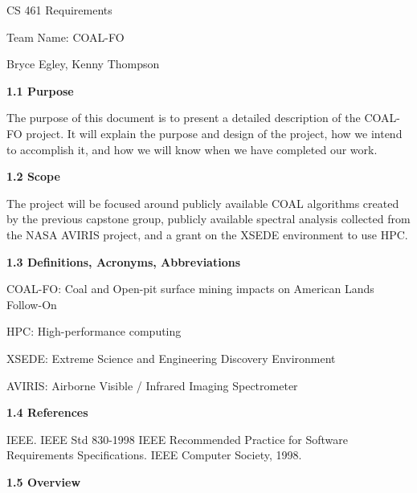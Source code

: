 \documentclass[a4paper,12pt]{article}
\begin{document}
\sloppy

\noindent CS 461 Requirements\par


\noindent Team Name: COAL-FO\par


\noindent Bryce Egley, Kenny Thompson\par


\par


\noindent \textbf{1.1 Purpose}\par


\noindent The purpose of this document is to present a detailed description of the COAL-FO project. It will explain the purpose and design of the project, how we intend to accomplish it, and how we will know when we have completed our work. \par


\noindent \textbf{1.2 Scope}\par


\noindent The project will be focused around publicly available COAL algorithms created by the previous capstone group, publicly available spectral analysis collected from the NASA AVIRIS project, and a grant on the XSEDE environment to use HPC. \par


\noindent \textbf{1.3 Definitions, Acronyms, Abbreviations}\par


\noindent COAL-FO: Coal and Open-pit surface mining impacts on American Lands Follow-On\par


\noindent HPC: High-performance computing\par


\noindent XSEDE: Extreme Science and Engineering Discovery Environment\par


\noindent AVIRIS: Airborne Visible / Infrared Imaging Spectrometer\par


\noindent \textbf{1.4 References}\par

IEEE. IEEE Std 830-1998 IEEE Recommended Practice for Software Requirements Specifications. IEEE Computer Society, 1998.\par


\noindent \textbf{1.5 Overview}\par
\end{document}
